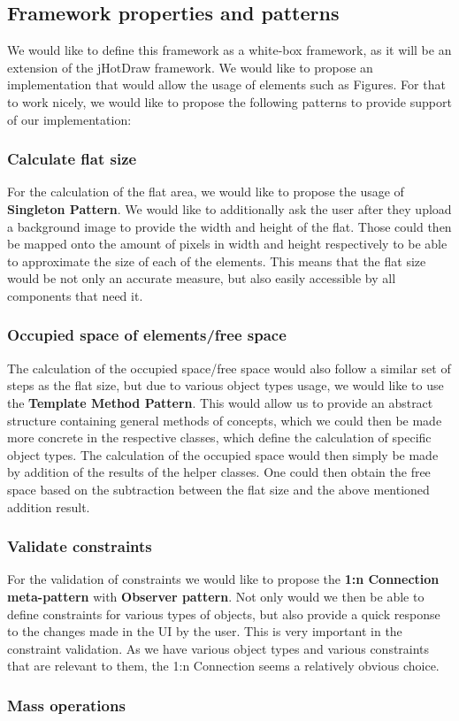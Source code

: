 \subsection{Framework properties and patterns}
We would like to define this framework as a white-box framework, as it will be an extension of the jHotDraw framework. We would like to propose an implementation that would allow the usage of elements such as Figures. For that to work nicely, we would like to propose the following patterns to provide support of our implementation:

\subsubsection{Calculate flat size}
For the calculation of the flat area, we would like to propose the usage of \textbf{Singleton Pattern}. We would like to additionally ask the user after they upload a background image to provide the width and height of the flat. Those could then be mapped onto the amount of pixels in width and height respectively to be able to approximate the size of each of the elements. This means that the flat size would be not only an accurate measure, but also easily accessible by all components that need it.

\subsubsection{Occupied space of elements/free space}
The calculation of the occupied space/free space would also follow a similar set of steps as the flat size, but due to various object types usage, we would like to use the \textbf{Template Method Pattern}. This would allow us to provide an abstract structure containing general methods of concepts, which we could then be made more concrete in the respective classes, which define the calculation of specific object types. The calculation of the occupied space would then simply be made by addition of the results of the helper classes. One could then obtain the free space based on the subtraction between the flat size and the above mentioned addition result.

\subsubsection{Validate constraints}
For the validation of constraints we would like to propose the \textbf{1:n Connection meta-pattern} with \textbf{Observer pattern}. Not only would we then be able to define constraints for various types of objects, but also provide a quick response to the changes made in the UI by the user. This is very important in the constraint validation. As we have various object types and various constraints that are relevant to them, the 1:n Connection seems a relatively obvious choice.

\subsubsection{Mass operations}
